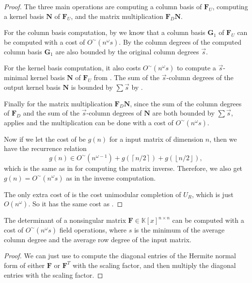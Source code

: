 \begin{proof}
The three main operations are computing a column basis of $\mathbf{F}_{U}$,
computing a kernel basis $\mathbf{N}$ of $\mathbf{F}_{U}$, and the
matrix multiplication $\mathbf{F}_{D}\mathbf{N}$.

For the column basis computation, by 
we know that a column basis $\mathbf{G}_{1}$ of $\mathbf{F}_{U}$
can be computed with a cost of $O^{\sim}\left(n^{\omega}s\right).$
By  the column degrees
of the computed column basis $\mathbf{G}_{1}$ are also bounded by
the original column degrees $\vec{s}$.

For the kernel basis computation, it also costs $O^{\sim}\left(n^{\omega}s\right)$
to compute a $\vec{s}$-minimal kernel basis $\mathbf{N}$ of $\mathbf{F}_{U}$
from . The sum of the $\vec{s}$-column
degrees of the output kernel basis $\mathbf{N}$ is bounded by $\sum\vec{s}$
by .

Finally for the matrix multiplication $\mathbf{F}_{D}\mathbf{N}$,
since the sum of the column degrees of $\mathbf{F}_{D}$ and the sum
of the $\vec{s}$-column degrees of $\mathbf{N}$ are both bounded
by $\sum\vec{s}$,  applies
and the multiplication can be done with a cost of $O^{\sim}\left(n^{\omega}s\right)$.

Now if we let the cost of  be $g(n)$
for a input matrix of dimension $n$, then we have the recurrence
relation
\[
g(n)\in O^{\sim}(n^{\omega-1})+g(\left\lceil n/2\right\rceil )+g(\left\lfloor n/2\right\rfloor ),
\]
 which is the same as in  for computing
the matrix inverse. Therefore, we also get $g(n)=O^{\sim}(n^{\omega}s)$
as in the inverse computation.

The only extra cost of 
is the cost unimodular completion of $U_{R}$, which is just $O\left(n^{\omega}\right)$.
So it has the same cost as . \end{proof}
\begin{cor}
The determinant of a nonsingular matrix $\mathbf{F}\in\mathbb{K}\left[x\right]^{n\times n}$
can be computed with a cost of $O^{\sim}(n^{\omega}s)$ field operations,
where $s$ is the minimum of the average column degree and the average
row degree of the input matrix.\end{cor}
\begin{proof}
We can just use 
to compute the diagonal entries of the Hermite normal form of either
$\mathbf{F}$ or $\mathbf{F}^{T}$ with the scaling factor, and then
multiply the diagonal entries with the scaling factor.\end{proof}

